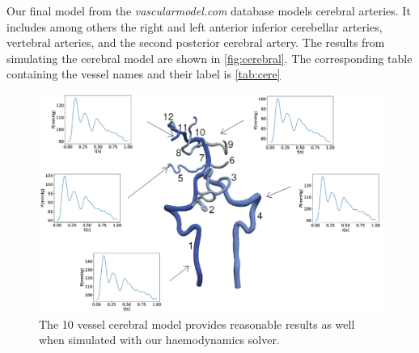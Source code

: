 \documentclass[a4paper, oneside]{discothesis}
\begin{document}
Our final model from the \emph{vascularmodel.com} database models cerebral arteries.
It includes among others the right and left anterior inferior cerebellar arteries, vertebral arteries, and the second posterior cerebral artery.
The results from simulating the cerebral model are shown in \autoref{fig:cerebral}.
The corresponding table containing the vessel names and their label is \autoref{tab:cere}
\begin{figure} [!ht]
	\centering
	\includegraphics[width=0.8\columnwidth]{figures/0053.eps}
	\caption{The 10 vessel cerebral model provides reasonable results as well when simulated with our haemodynamics solver.}
	\label{fig:cerebral}
\end{figure}
\end{document}

